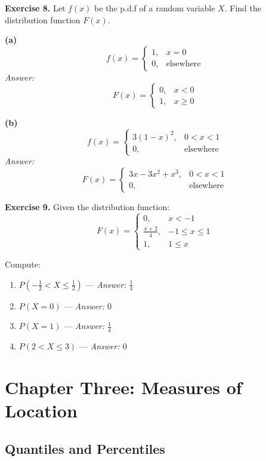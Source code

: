 \documentclass[
]{article}
\providecommand{\tightlist}{%
  \setlength{\itemsep}{0pt}\setlength{\parskip}{0pt}}
\begin{document}
\textbf{Exercise 8.} Let \(f(x)\) be the p.d.f of a random variable
\(X\). Find the distribution function \(F(x)\).

\textbf{(a)}
\[f(x) = \begin{cases} 1, & x = 0 \\ 0, & \text{elsewhere} \end{cases}\]
\emph{Answer:}
\[F(x) = \begin{cases} 0, & x < 0 \\ 1, & x \geq 0 \end{cases}\]

\textbf{(b)}
\[f(x) = \begin{cases} 3(1-x)^2, & 0 < x < 1 \\ 0, & \text{elsewhere} \end{cases}\]
\emph{Answer:}
\[F(x) = \begin{cases} 3x - 3x^2 + x^3, & 0 < x < 1 \\ 0, & \text{elsewhere} \end{cases}\]

\textbf{Exercise 9.} Given the distribution function:
\[F(x) = \begin{cases} 0, & x < -1 \\ \frac{x+2}{4}, & -1 \leq x \leq 1 \\ 1, & 1 \leq x \end{cases}\]

Compute:

\begin{enumerate}
\def\labelenumi{\arabic{enumi}.}
\tightlist
\item
  \(P\!\left(-\frac{1}{2} < X \leq \frac{1}{2}\right)\) ---
  \emph{Answer: \(\frac{1}{4}\)}
\item
  \(P(X = 0)\) --- \emph{Answer: \(0\)}
\item
  \(P(X = 1)\) --- \emph{Answer: \(\frac{1}{4}\)}
\item
  \(P(2 < X \leq 3)\) --- \emph{Answer: \(0\)}
\end{enumerate}

\section{Chapter Three: Measures of
Location}\label{chapter-three-measures-of-location}

\subsection{Quantiles and Percentiles}\label{quantiles-and-percentiles}
\end{document}
